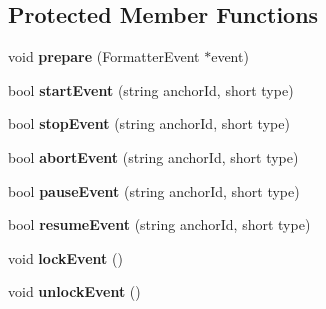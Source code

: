 \subsection*{Protected Member Functions}
\begin{CompactItemize}
\item 
void \textbf{prepare} (FormatterEvent $\ast$event)\label{classbr_1_1pucrio_1_1telemidia_1_1ginga_1_1ncl_1_1adapters_1_1application_1_1ApplicationPlayerAdapter_031985ded10c444e2db49e40c828ab88}

\item 
bool \textbf{startEvent} (string anchorId, short type)\label{classbr_1_1pucrio_1_1telemidia_1_1ginga_1_1ncl_1_1adapters_1_1application_1_1ApplicationPlayerAdapter_ad41686a46bcf6c89f70ab957885ff08}

\item 
bool \textbf{stopEvent} (string anchorId, short type)\label{classbr_1_1pucrio_1_1telemidia_1_1ginga_1_1ncl_1_1adapters_1_1application_1_1ApplicationPlayerAdapter_971fe73c9725d5bae9ca030cf404496e}

\item 
bool \textbf{abortEvent} (string anchorId, short type)\label{classbr_1_1pucrio_1_1telemidia_1_1ginga_1_1ncl_1_1adapters_1_1application_1_1ApplicationPlayerAdapter_e96e198e322e2b8d99fe5f5682dfa2a3}

\item 
bool \textbf{pauseEvent} (string anchorId, short type)\label{classbr_1_1pucrio_1_1telemidia_1_1ginga_1_1ncl_1_1adapters_1_1application_1_1ApplicationPlayerAdapter_4eedc7289b5f1bc4a889f550268a4b25}

\item 
bool \textbf{resumeEvent} (string anchorId, short type)\label{classbr_1_1pucrio_1_1telemidia_1_1ginga_1_1ncl_1_1adapters_1_1application_1_1ApplicationPlayerAdapter_ddb9287c453f55ee0f7431be23cf73af}

\item 
void \textbf{lockEvent} ()\label{classbr_1_1pucrio_1_1telemidia_1_1ginga_1_1ncl_1_1adapters_1_1application_1_1ApplicationPlayerAdapter_ab9544acc633c3be1ecbf645a8ba1692}

\item 
void \textbf{unlockEvent} ()\label{classbr_1_1pucrio_1_1telemidia_1_1ginga_1_1ncl_1_1adapters_1_1application_1_1ApplicationPlayerAdapter_c8d60ce5b32cb745777c282c60a58074}

\end{CompactItemize}
